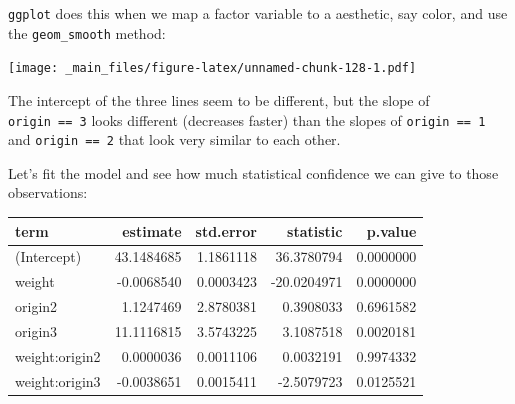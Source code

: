 \documentclass[]{article}
\newenvironment{Shaded}{\begin{snugshade}}{\end{snugshade}}
\newcommand{\KeywordTok}[1]{\textcolor[rgb]{0.13,0.29,0.53}{\textbf{{#1}}}}
\newcommand{\DataTypeTok}[1]{\textcolor[rgb]{0.13,0.29,0.53}{{#1}}}
\newcommand{\StringTok}[1]{\textcolor[rgb]{0.31,0.60,0.02}{{#1}}}
\newcommand{\NormalTok}[1]{{#1}}
\theoremstyle{definition}
\theoremstyle{definition}
\theoremstyle{remark}
\begin{document}
\texttt{ggplot} does this when we map a factor variable to a aesthetic,
say color, and use the \texttt{geom\_smooth} method:

\begin{Shaded}
\end{Shaded}

\texttt{[image: \_main\_files/figure-latex/unnamed-chunk-128-1.pdf]}

The intercept of the three lines seem to be different, but the slope of
\texttt{origin\ ==\ 3} looks different (decreases faster) than the
slopes of \texttt{origin\ ==\ 1} and \texttt{origin\ ==\ 2} that look
very similar to each other.

Let's fit the model and see how much statistical confidence we can give
to those observations:

\begin{Shaded}
\end{Shaded}

\begin{tabular}{l|r|r|r|r}
\hline
term & estimate & std.error & statistic & p.value\\
\hline
(Intercept) & 43.1484685 & 1.1861118 & 36.3780794 & 0.0000000\\
\hline
weight & -0.0068540 & 0.0003423 & -20.0204971 & 0.0000000\\
\hline
origin2 & 1.1247469 & 2.8780381 & 0.3908033 & 0.6961582\\
\hline
origin3 & 11.1116815 & 3.5743225 & 3.1087518 & 0.0020181\\
\hline
weight:origin2 & 0.0000036 & 0.0011106 & 0.0032191 & 0.9974332\\
\hline
weight:origin3 & -0.0038651 & 0.0015411 & -2.5079723 & 0.0125521\\
\hline
\end{tabular}
\end{document}
